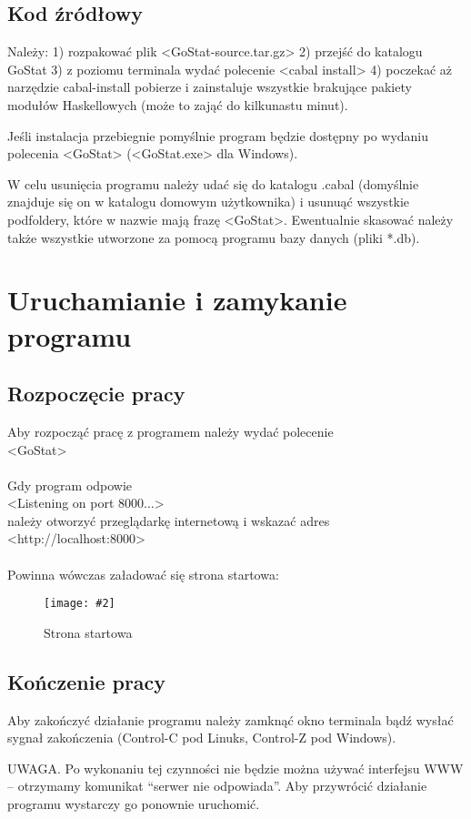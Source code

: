 \documentclass[10pt,leqno]{article}
\newcommand{\myimage}[3]{
  \begin{figure}[h!]
    \centering
      \texttt{[image: \#2]}
  \caption{#3}
  \end{figure}
}
\begin{document}
\subsection{Kod źródłowy}
Należy:
1) rozpakować plik <GoStat-source.tar.gz>
2) przejść do katalogu GoStat
3) z poziomu terminala wydać polecenie <cabal install>
4) poczekać aż narzędzie cabal-install pobierze i zainstaluje wszystkie brakujące pakiety modułów Haskellowych (może to zająć do kilkunastu minut).

Jeśli instalacja przebiegnie pomyślnie program będzie dostępny po wydaniu polecenia <GoStat> (<GoStat.exe> dla Windows).

W celu usunięcia programu należy udać się do katalogu .cabal (domyślnie znajduje się on w katalogu domowym użytkownika) i usunuąć wszystkie
podfoldery, które w nazwie mają frazę <GoStat>. Ewentualnie skasować należy także wszystkie utworzone za pomocą programu bazy danych (pliki *.db).

\newpage

\section{Uruchamianie i zamykanie programu}

\subsection{Rozpoczęcie pracy}
Aby rozpocząć pracę z programem należy wydać polecenie \\
<GoStat> \\ 
\\
Gdy program odpowie \\
<Listening on port 8000...> \\
należy otworzyć przeglądarkę internetową i wskazać adres \\
<http://localhost:8000> \\
\\
Powinna wówczas załadować się strona startowa:

\myimage{0.4}{start.png}{Strona startowa}

\subsection{Kończenie pracy}
Aby zakończyć działanie programu należy zamknąć okno terminala bądź wysłać sygnał zakończenia (Control-C pod Linuks, Control-Z pod Windows).

UWAGA. Po wykonaniu tej czynności nie będzie można używać interfejsu WWW -- otrzymamy komunikat ``serwer nie odpowiada''. Aby przywrócić działanie programu
wystarczy go ponownie uruchomić.
\end{document}
